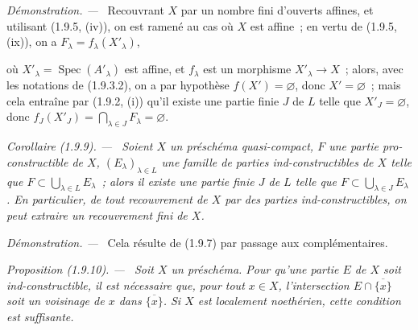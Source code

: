 \documentclass[10pt,oneside]{book}
\makeatletter
\newcommand{\setmanualcurrentlabel}[1]{\def\@currentlabel{#1}}
\newcommand{\oldpage}[2][]{%
  \setcounter{footnote}{0}%
  \marginpar{\scriptsize\textbf{#1}~|~#2}\ignorespaces}
\newenvironment{proposition}[1][]{%
  \setmanualcurrentlabel{#1}\par\medskip\noindent\itshape Proposition (#1). ---\ }{\par}
\newenvironment{corollary}[1][]{%
  \setmanualcurrentlabel{#1}\par\medskip\noindent\itshape Corollaire (#1). ---\ }{\par}
\newenvironment{proof}{%
  \par\medskip\noindent\textit{Démonstration. ---\ }}{\par}
\makeatother
\begin{document}
\begin{proof}
Recouvrant $X$ par un nombre fini d'ouverts affines, et utilisant (1.9.5,
(iv)), on est ramené au cas où $X$ est affine~; en vertu de (1.9.5, (ix)), on
a $F_\lambda=f_\lambda(X'_\lambda)$,

\oldpage[IV-1]{246}

où $X'_\lambda=\operatorname{Spec}(A'_\lambda)$ est affine, et $f_\lambda$
est un morphisme $X'_\lambda\to X$~; alors, avec les notations de (1.9.3.2),
on a par hypothèse $f(X')=\varnothing$, donc $X'=\varnothing$~; mais cela
entraîne par (1.9.2, (i)) qu'il existe une partie finie $J$ de $L$ telle que
$X'_J=\varnothing$, donc
$f_J(X'_J)=\bigcap_{\lambda\in J}F_\lambda=\varnothing$.
\end{proof}

\begin{corollary}[1.9.9]
\label{IV.1.9.9-fr}
Soient $X$ un préschéma quasi-compact, $F$ une partie pro-constructible de
$X$, $(E_\lambda)_{\lambda\in L}$ une famille de parties ind-constructibles
de $X$ telle que $F\subset\bigcup_{\lambda\in L}E_\lambda$~; alors il existe
une partie finie $J$ de $L$ telle que
$F\subset\bigcup_{\lambda\in J}E_\lambda$. En particulier, de tout
recouvrement de $X$ par des parties ind-constructibles, on peut extraire un
recouvrement fini de $X$.
\end{corollary}

\begin{proof}
Cela résulte de (1.9.7) par passage aux complémentaires.
\end{proof}

\begin{proposition}[1.9.10]
\label{IV.1.9.10-fr}
Soit $X$ un préschéma. Pour qu'une partie $E$ de $X$ soit
ind-constructible, il est nécessaire que, pour tout $x\in X$, l'intersection
$E\cap\overline{\{x\}}$ soit un voisinage de $x$ dans
$\overline{\{x\}}$. Si $X$ est localement noethérien, cette condition est
suffisante.
\end{proposition}
\end{document}
